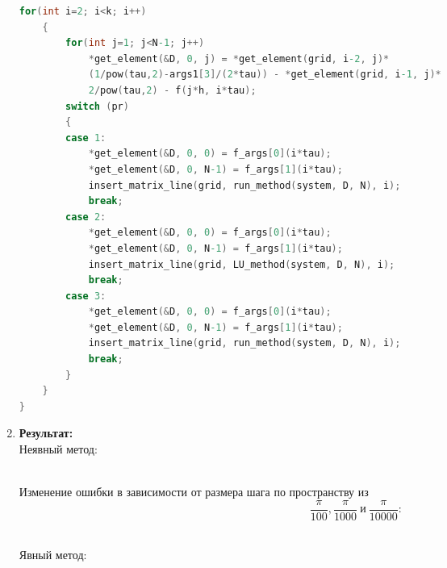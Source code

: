 \documentclass[12pt]{article}
\begin{document}
\begin{enumerate}
\begin{lstlisting}[language=C]
    for(int i=2; i<k; i++)
    {
        for(int j=1; j<N-1; j++)
            *get_element(&D, 0, j) = *get_element(grid, i-2, j)*
            (1/pow(tau,2)-args1[3]/(2*tau)) - *get_element(grid, i-1, j)*
            2/pow(tau,2) - f(j*h, i*tau);
        switch (pr)
        {
        case 1:
            *get_element(&D, 0, 0) = f_args[0](i*tau);
            *get_element(&D, 0, N-1) = f_args[1](i*tau);
            insert_matrix_line(grid, run_method(system, D, N), i);
            break;
        case 2:
            *get_element(&D, 0, 0) = f_args[0](i*tau);
            *get_element(&D, 0, N-1) = f_args[1](i*tau);
            insert_matrix_line(grid, LU_method(system, D, N), i);
            break;
        case 3:
            *get_element(&D, 0, 0) = f_args[0](i*tau);
            *get_element(&D, 0, N-1) = f_args[1](i*tau);
            insert_matrix_line(grid, run_method(system, D, N), i);
            break;
        }
    }
}      
            \end{lstlisting}
        \item \textbf{Результат:}\\
        Неявный метод:
        \begin{figure}[h]
            \label{ris:image}
        \end{figure}\\

        Изменение ошибки в зависимости от размера шага по пространству из 
        $$\frac{\pi}{100},\frac{\pi}{1000}~и~\frac{\pi}{10000}:$$
        \begin{figure}[h]
            \label{ris:image}
        \end{figure}\\
        \newpage
        Явный метод:


\end{enumerate}
\end{document}
